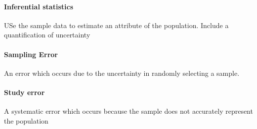 \documentclass[12pt]{report}
\begin{document}
      \paragraph{Inferential statistics} USe the sample data to estimate an
      attribute of the population. Include a quantification of uncertainty

      \paragraph{Sampling Error} An error which occurs due to the uncertainty
      in randomly selecting a sample.

      \paragraph{Study error} A systematic error which occurs because the
      sample does not accurately represent the population
\end{document}
